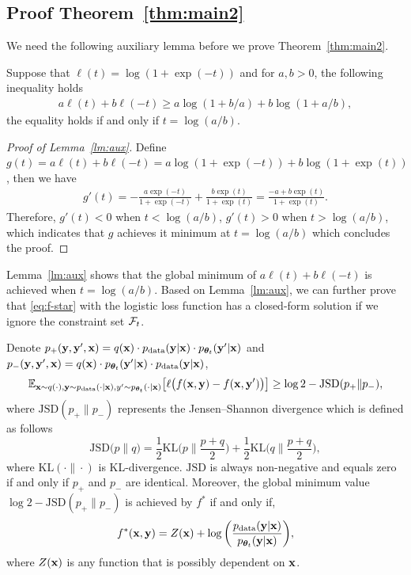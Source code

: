 \documentclass{article}
\newcommand{\todoq}[2][]{\todo[size=\scriptsize,color=orange!20!white,#1]{Quanquan: #2}}
\begin{document}
\subsection{Proof Theorem~\ref{thm:main2}}
We need the following auxiliary lemma before we prove Theorem~\ref{thm:main2}.
\begin{lemma}\label{lm:aux}
Suppose that $\ell(t) = \log(1 + \exp(-t))$ and for $a, b > 0$, the following inequality holds
\begin{align*}
 a\ell(t) + b\ell(-t) \geq a\log(1+b/a) + b\log(1 + a/b),     
\end{align*}
the equality holds if and only if $t = \log(a/b)$. 
\end{lemma}
\begin{proof}[Proof of Lemma~\ref{lm:aux}]
Define $g(t) =  a\ell(t) + b\ell(-t) =  a\log(1+\exp(-t)) + b\log(1+\exp(t))$, then we have 
\begin{align*}
g'(t) = -\frac{a\exp(-t)}{1+\exp(-t)} +   \frac{b\exp(t)}{1+\exp(t)} = \frac{-a+b\exp(t)}{1+\exp(t)}.
\end{align*}
Therefore, $g'(t) < 0$ when $t < \log(a/b)$, $g'(t) > 0$ when $t > \log(a/b)$, which indicates that $g$ achieves it minimum at $t = \log(a/b)$ which concludes the proof.
\end{proof}


Lemma~\ref{lm:aux} shows that the global minimum of $a\ell(t) + b\ell(-t)$ is achieved when $t = \log(a/b)$. Based on Lemma~\ref{lm:aux}, we can further prove that \eqref{eq:f-star} with the logistic loss function has a closed-form solution if we ignore the constraint set $\mathcal{F}_{t}$. 

\begin{lemma}\label{thm:closed-form solution}
Denote $p_{+}(\mathbf{y}, \mathbf{y}', \mathbf{x}) = q(\mathbf{x})\cdot p_{\mathrm{data}}(\mathbf{y}|\mathbf{x})\cdot p_{\bm{\theta}_t}(\mathbf{y}'|\mathbf{x})$ and $p_{-}(\mathbf{y}, \mathbf{y}', \mathbf{x}) = q(\mathbf{x})\cdot p_{\bm{\theta}_t}(\mathbf{y}'|\mathbf{x}) \cdot p_{\mathrm{data}}(\mathbf{y}|\mathbf{x})$, 
\begin{align*}
\mathbb{E}_{\mathbf{x}\sim q(\cdot), \mathbf{y}\sim p_{\mathrm{data}}(\cdot|\mathbf{x}), y'\sim p_{\bm{\theta}_t}(\cdot|\mathbf{x})}\big[ \ell\big(f(\mathbf{x}, \mathbf{y}) - f(\mathbf{x}, \mathbf{y}')\big) 
\big] \geq \log2 - \mathrm{JSD}(p_{+}\|p_{-}),
\end{align*}
where $\mathrm{JSD}(p_{+}\|p_{-})$ represents the Jensen–Shannon divergence which is defined as follows
\begin{equation*}
    \mathrm{JSD}\Big(p \Big\|q\Big) = \frac{1}{2}\mathrm{KL}\Big(p \Big\|\frac{p+q}{2}\Big) +  \frac{1}{2}\mathrm{KL}\Big(q \Big\|\frac{p+q}{2}\Big),
\end{equation*}
where $\mathrm{KL}(\cdot\|\cdot)$ is KL-divergence. $\mathrm{JSD}$ is always non-negative and equals zero if and only if $p_{+}$ and $p_{-}$ are identical. Moreover, the global minimum value $\log 2 - \mathrm{JSD}(p_{+}\|p_{-})$ is achieved by $f^{*}$ if and only if, 
\begin{align*}
f^{*}(\mathbf{x}, \mathbf{y}) =   Z(\mathbf{x}) + \log\bigg(\frac{p_{\mathrm{data}}(\mathbf{y}|\mathbf{x})}{p_{\bm{\theta}_{t}}(\mathbf{y}|\mathbf{x})}\bigg),   
\end{align*}
where $Z(\mathbf{x})$ is any function that is possibly dependent on $\mathbf{x}$. %
\end{lemma}
\end{document}
